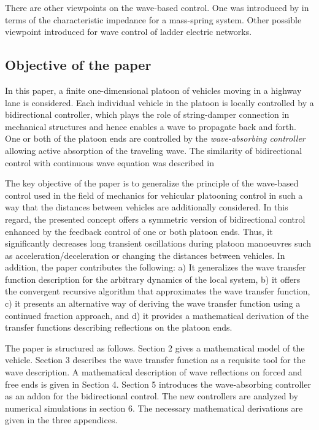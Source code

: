 \documentclass[final,5p,times,twocolumn]{elsarticle}
\begin{document}
There are other viewpoints on the wave-based control. One was introduced by \cite{Ojima2001} in terms of the characteristic impedance for a mass-spring system. Other possible viewpoint introduced \cite{Nagase2005} for wave control of ladder electric networks.


\subsection{Objective of the paper}
In this paper, a finite one-dimensional platoon of vehicles moving in a highway lane is considered. Each individual vehicle in the platoon is locally controlled by a bidirectional controller, which plays the role of string-damper connection in mechanical structures and hence enables a wave to propagate back and forth. One or both of the platoon ends are controlled by the \emph{wave-absorbing controller} allowing active absorption of the traveling wave. The similarity of bidirectional control with continuous wave equation was described in \cite{Herman2013}

The key objective of the paper is to generalize the principle of the wave-based control used in the field of mechanics for vehicular platooning control in such a way that the distances between vehicles are additionally considered. In this regard, the presented concept offers a symmetric version of bidirectional control enhanced by the feedback control of one or both platoon ends. Thus, it significantly decreases long transient oscillations during platoon manoeuvres such as acceleration/deceleration or changing the distances between vehicles. In addition, the paper contributes the following: a) It generalizes the wave transfer function description for the arbitrary dynamics of the local system, b) it offers the convergent recursive algorithm that approximates the wave transfer function, c) it presents an alternative way of deriving the wave transfer function using a continued fraction approach, and d) it provides a mathematical derivation of the transfer functions describing reflections on the platoon ends.

The paper is structured as follows. Section 2 gives a mathematical model of the vehicle. Section 3 describes the wave transfer function as a requisite tool for the wave description. A mathematical description of wave reflections on forced and free ends is given in Section 4. Section 5 introduces the wave-absorbing controller as an addon for the bidirectional control. The new controllers are analyzed by numerical simulations in section 6. The necessary mathematical derivations are given in the three appendices.
\end{document}
